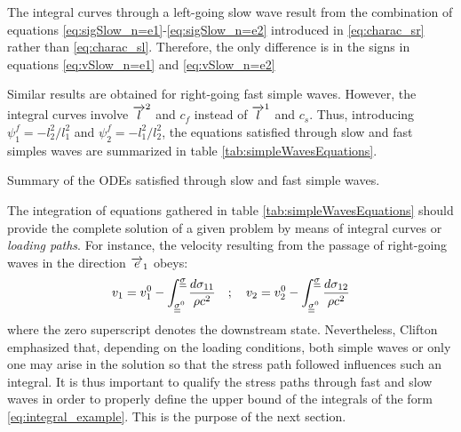 \begin{remark}
  The integral curves through a left-going slow wave result from the combination of equations \eqref{eq:sigSlow_n=e1}-\eqref{eq:sigSlow_n=e2} introduced in \eqref{eq:charac_sr} rather than \eqref{eq:charac_sl}.
  Therefore, the only difference is in the signs in equations \eqref{eq:vSlow_n=e1} and \eqref{eq:vSlow_n=e2}
\end{remark}

Similar results are obtained for right-going fast simple waves.
However, the integral curves involve ${\overrightarrow{l}}^2$ and $c_f$ instead of ${\overrightarrow{l}}^1$ and $c_s$. 
Thus, introducing $\psi^f_1=-l_2^2/l_1^2$ and $\psi^f_2=-l_1^2/l_2^2$, the equations satisfied through slow and fast simples waves are summarized in table \ref{tab:simpleWavesEquations}.
\begin{table}[h!]
  \centering
  
  \caption{Summary of the ODEs satisfied through slow and fast simple waves.}
  \label{tab:simpleWavesEquations}
\end{table}

The integration of equations gathered in table \ref{tab:simpleWavesEquations} should provide the complete solution of a given problem by means of integral curves or \textit{loading paths}.
For instance, the velocity resulting from the passage of right-going waves in the direction ${\overrightarrow{e}}_1$ obeys:
\begin{equation}
  \label{eq:integral_example}
  v_1 = v_1^0 - \int_{{\underline{\underline{\sigma}}}^0}^{{\underline{\underline{\sigma}}}} \frac{d \sigma_{11}}{\rho c^2} \quad ;\quad v_2 = v_2^0 - \int_{{\underline{\underline{\sigma}}}^0}^{{\underline{\underline{\sigma}}}} \frac{d \sigma_{12}}{\rho c^2}
\end{equation}
where the zero superscript denotes the downstream state.
Nevertheless, Clifton \cite{Clifton} emphasized that, depending on the loading conditions, both simple waves or only one may arise in the solution so that the stress path followed influences such an integral.
It is thus important to qualify the stress paths through fast and slow waves in order to properly define the upper bound of the integrals of the form \eqref{eq:integral_example}.
This is the purpose of the next section.




